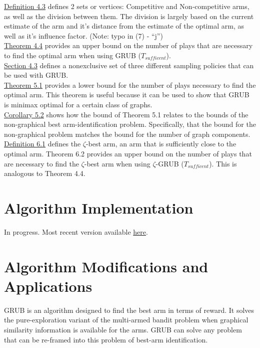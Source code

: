 \documentclass{article}[12pt]
\begin{document}
\underline{Definition 4.3} defines 2 sets or vertices: Competitive and Non-competitive arms, as well as the division between them.
The division is largely based on the current estimate of the arm and it’s distance from the estimate of the optimal arm, as well as it’s influence factor.
(Note: typo in (7) - “j”) \\

\underline{Theorem 4.4} provides an upper bound on the number of plays that are necessary to find the optimal arm when using GRUB ($T_{sufficent}$). \\

\underline{Section 4.3} defines a nonexclusive set of three different sampling policies that can be used with GRUB. \\

\underline{Theorem 5.1} provides a lower bound for the number of plays necessary to find the optimal arm.
This theorem is useful because it can be used to show that GRUB is minimax optimal for a certain class of graphs. \\

\underline{Corollary 5.2} shows how the bound of Theorem 5.1 relates to the bounds of the non-graphical best arm-identification problem.
Specifically, that the bound for the non-graphical problem matches the bound for the number of graph components. \\

\underline{Definition 6.1} defines the $\zeta$-best arm, an arm that is sufficiently close to the optimal arm.
Theorem 6.2 provides an upper bound on the number of plays that are necessary to find the $\zeta$-best arm when using $\zeta$-GRUB ($T_{sufficent}$). This is analogous to Theorem 4.4.


\section{Algorithm Implementation}

In progress.
Most recent version available \href{https://github.com/sstalley/RPE_GRUB}{here}.

\pagebreak

\section{Algorithm Modifications and Applications}

GRUB is an algorithm designed to find the best arm in terms of reward.
It solves the pure-exploration variant of the multi-armed bandit problem when graphical similarity information is available for the arms.
GRUB can solve any problem that can be re-framed into this problem of best-arm identification. \\
\end{document}
